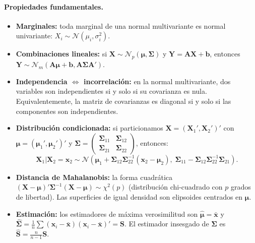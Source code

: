 \documentclass[12pt, a4paper]{article}
\theoremstyle{plain}
\theoremstyle{definition}
\theoremstyle{remark}
\newcommand{\mat}[1]{\mathbf{#1}}
\begin{document}
\paragraph{Propiedades fundamentales.}

\begin{itemize}
  \item \textbf{Marginales:} toda marginal de una normal multivariante es
        normal univariante: $X_i\sim\mathcal{N}(\mu_i,\sigma_i^2)$.

  \item \textbf{Combinaciones lineales:} si $\mathbf{X}\sim\mathcal{N}_p(\boldsymbol{\mu},\boldsymbol{\Sigma})$
        y $\mathbf{Y}=\mat{A}\mathbf{X}+\mathbf{b}$, entonces
        $\mathbf{Y}\sim\mathcal{N}_m(\mat{A}\boldsymbol{\mu}+\mathbf{b},\mat{A}\boldsymbol{\Sigma}\mat{A}')$.

  \item \textbf{Independencia $\Leftrightarrow$ incorrelación:} en la normal
        multivariante, dos variables son independientes si y solo si su
        covarianza es nula. Equivalentemente, la matriz de covarianzas es
        diagonal si y solo si las componentes son independientes.

  \item \textbf{Distribución condicionada:} si particionamos
        $\mathbf{X}=(\mathbf{X}_1',\mathbf{X}_2')'$ con
        $\boldsymbol{\mu}=(\boldsymbol{\mu}_1',\boldsymbol{\mu}_2')'$ y
        $\boldsymbol{\Sigma}=\begin{pmatrix}\boldsymbol{\Sigma}_{11}&\boldsymbol{\Sigma}_{12}\\\boldsymbol{\Sigma}_{21}&\boldsymbol{\Sigma}_{22}\end{pmatrix}$,
        entonces:
        \[
          \mathbf{X}_1|\mathbf{X}_2=\mathbf{x}_2 \sim \mathcal{N}\!\left(
          \boldsymbol{\mu}_1 + \boldsymbol{\Sigma}_{12}\boldsymbol{\Sigma}_{22}^{-1}(\mathbf{x}_2-\boldsymbol{\mu}_2),\;
          \boldsymbol{\Sigma}_{11} - \boldsymbol{\Sigma}_{12}\boldsymbol{\Sigma}_{22}^{-1}\boldsymbol{\Sigma}_{21}
          \right).
        \]

  \item \textbf{Distancia de Mahalanobis:} la forma cuadrática
        $(\mathbf{X}-\boldsymbol{\mu})'\boldsymbol{\Sigma}^{-1}(\mathbf{X}-\boldsymbol{\mu})\sim\chi^2(p)$
        (distribución chi-cuadrado con $p$ grados de libertad). Las
        superficies de igual densidad son elipsoides centrados en
        $\boldsymbol{\mu}$.

  \item \textbf{Estimación:} los estimadores de máxima verosimilitud son
        $\hat{\boldsymbol{\mu}}=\bar{\mathbf{x}}$ y
        $\hat{\boldsymbol{\Sigma}}=\frac{1}{n}\sum(\mathbf{x}_i-\bar{\mathbf{x}})(\mathbf{x}_i-\bar{\mathbf{x}})'=\mat{S}$.
        El estimador insesgado de $\boldsymbol{\Sigma}$ es $\hat{\mat{S}}=\frac{n}{n-1}\mat{S}$.
\end{itemize}
\end{document}
